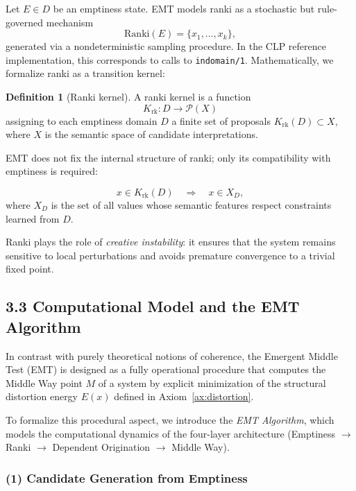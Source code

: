 \documentclass[11pt]{article}
\theoremstyle{definition}
\newtheorem{definition}[theorem]{Definition}
\theoremstyle{remark}
\begin{document}
Let $E \in D$ be an emptiness state.  EMT models ranki as a
stochastic but rule-governed mechanism
\[
   \mathrm{Ranki}(E) = \{ x_1,\dots,x_k \},
\]
generated via a nondeterministic sampling procedure.  In the CLP
reference implementation, this corresponds to calls to \texttt{indomain/1}.
Mathematically, we formalize ranki as a transition kernel:

\begin{definition}[Ranki kernel]
A ranki kernel is a function
\[
 K_{\mathrm{rk}} : D \to \mathcal{P}(X)
\]
assigning to each emptiness domain $D$ a finite set of proposals
$K_{\mathrm{rk}}(D) \subset X$, where $X$ is the semantic space of
candidate interpretations.
\end{definition}

EMT does not fix the internal structure of ranki; only its
compatibility with emptiness is required:

\[
   x \in K_{\mathrm{rk}}(D) \quad\Rightarrow\quad x \in X_D,
\]
where $X_D$ is the set of all values whose semantic features respect
constraints learned from $D$.

Ranki plays the role of \emph{creative instability}: it ensures that
the system remains sensitive to local perturbations and avoids
premature convergence to a trivial fixed point.


\subsection{3.3 Computational Model and the EMT Algorithm}

In contrast with purely theoretical notions of coherence, the
Emergent Middle Test (EMT) is designed as a fully operational
procedure that computes the Middle Way point $M$ of a system by
explicit minimization of the structural distortion energy $E(x)$
defined in Axiom~\ref{ax:distortion}.

To formalize this procedural aspect, we introduce the
\emph{EMT Algorithm}, which models the computational dynamics of
the four-layer architecture (Emptiness $\rightarrow$ Ranki
$\rightarrow$ Dependent Origination $\rightarrow$ Middle Way).

\subsubsection*{(1) Candidate Generation from Emptiness}
\end{document}

